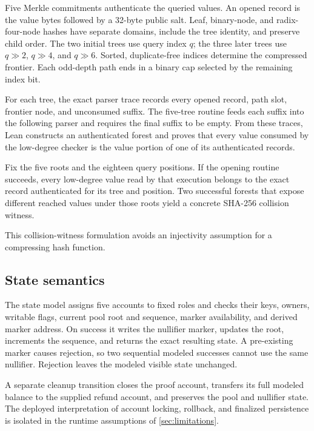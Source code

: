 Five Merkle commitments authenticate the queried values.  An opened record is
the value bytes followed by a 32-byte public salt.  Leaf, binary-node, and
radix-four-node hashes have separate domains, include the tree identity, and
preserve child order.  The two initial trees use query index \(q\); the three
later trees use \(q\!\gg\!2\), \(q\!\gg\!4\), and \(q\!\gg\!6\).
Sorted, duplicate-free indices determine the compressed frontier.  Each
odd-depth path ends in a binary cap selected by the remaining index bit.

For each tree, the exact parser trace records every opened record, path slot,
frontier node, and unconsumed suffix.  The five-tree routine feeds each suffix
into the following parser and requires the final suffix to be empty.  From
these traces, Lean constructs an authenticated forest and proves that every
value consumed by the low-degree checker is the value portion of one of its
authenticated records.

\begin{theorem}
\label{thm:authenticated-consumption}
Fix the five roots and the eighteen query positions.  If the opening routine
succeeds, every low-degree value read by that execution belongs to the exact
record authenticated for its tree and position.  Two successful forests that
expose different reached values under those roots yield a concrete SHA-256
collision witness.
\end{theorem}

This collision-witness formulation avoids an injectivity assumption for a
compressing hash function.

\subsection{State semantics}

The state model assigns five accounts to fixed roles and checks their keys,
owners, writable flags, current pool root and sequence, marker availability,
and derived marker address.  On success it writes the nullifier marker,
updates the root, increments the sequence, and returns the exact resulting
state.  A pre-existing marker causes rejection, so two sequential modeled
successes cannot use the same nullifier.  Rejection leaves the modeled visible
state unchanged.

A separate cleanup transition closes the proof account, transfers its full
modeled balance to the supplied refund account, and preserves the pool and
nullifier state.  The deployed interpretation of account locking, rollback,
and finalized persistence is isolated in the runtime assumptions of
\cref{sec:limitations}.


